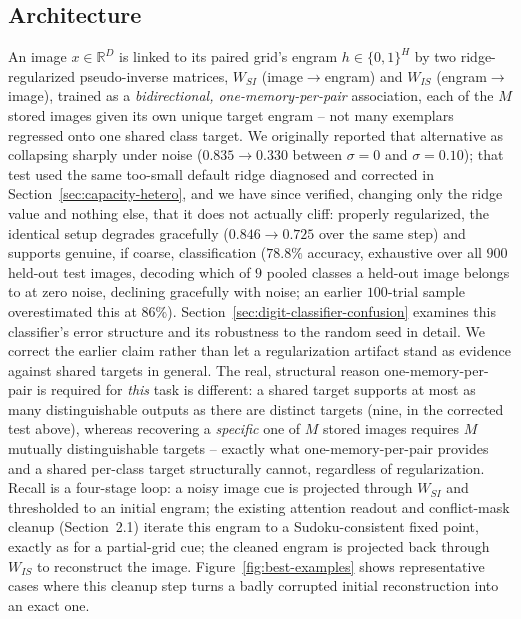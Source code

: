 \documentclass[11pt]{article}
\begin{document}
\subsection{Architecture}
\label{sec:hetero-arch}

An image $x\in\mathbb{R}^{D}$ is linked to its paired grid's engram $h\in\{0,1\}^H$ by two
ridge-regularized pseudo-inverse matrices, $W_{SI}$ (image$\to$engram) and $W_{IS}$
(engram$\to$image), trained as a \emph{bidirectional, one-memory-per-pair} association, each
of the $M$ stored images given its own unique target engram -- not many exemplars regressed
onto one shared class target. We originally reported that alternative as collapsing sharply
under noise ($0.835\to0.330$ between $\sigma=0$ and $\sigma=0.10$); that test used the same
too-small default ridge diagnosed and corrected in Section~\ref{sec:capacity-hetero}, and we
have since verified, changing only the ridge value and nothing else, that it does not actually
cliff: properly regularized, the identical setup degrades gracefully ($0.846\to0.725$ over the
same step) and supports genuine, if coarse, classification ($78.8\%$ accuracy, exhaustive over
all $900$ held-out test images, decoding which of $9$ pooled classes a held-out image belongs
to at zero noise, declining gracefully with noise; an earlier $100$-trial sample overestimated
this at $86\%$). Section~\ref{sec:digit-classifier-confusion} examines this classifier's error
structure and its robustness to the random seed in detail. We correct the earlier claim rather
than let a regularization artifact stand as
evidence against shared targets in general. The real, structural reason one-memory-per-pair is
required for \emph{this} task is different: a shared target supports at most as many
distinguishable outputs as there are distinct targets (nine, in the corrected test above),
whereas recovering a \emph{specific} one of $M$ stored images requires $M$ mutually
distinguishable targets -- exactly what one-memory-per-pair provides and a shared per-class
target structurally cannot, regardless of regularization. Recall is a four-stage loop: a noisy image cue is
projected through $W_{SI}$ and thresholded to an initial engram; the existing attention readout
and conflict-mask cleanup (Section~2.1) iterate this engram to a Sudoku-consistent fixed point,
exactly as for a partial-grid cue; the cleaned engram is projected back through $W_{IS}$ to
reconstruct the image. Figure~\ref{fig:best-examples} shows representative cases where this
cleanup step turns a badly corrupted initial reconstruction into an exact one.
\end{document}
